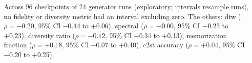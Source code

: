 Across 96 checkpoints of 24 generator runs (exploratory; intervals resample runs), no fidelity or diversity metric had an interval excluding zero. The others: dtw ($\rho=-0.20$, 95\% CI $-$0.44 to +0.06), spectral ($\rho=-0.00$, 95\% CI $-$0.25 to +0.23), diversity ratio ($\rho=-0.12$, 95\% CI $-$0.34 to +0.13), memorization fraction ($\rho=+0.18$, 95\% CI $-$0.07 to +0.40), c2st accuracy ($\rho=+0.04$, 95\% CI $-$0.20 to +0.25).
